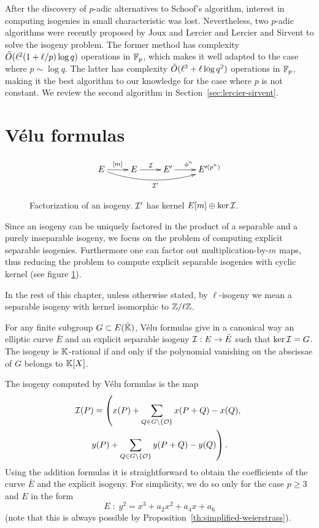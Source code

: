 After the discovery of $p$-adic alternatives to Schoof's
algorithm\cite{satoh00}, interest in computing isogenies in small
characteristic was lost. Nevertheless, two $p$-adic algorithms were
recently proposed by Joux and Lercier \cite{joux+lercier06} and
Lercier and Sirvent \cite{lercier+sirvent08} to solve the isogeny
problem. The former method has complexity $\tilde{O}(\ell^2(1 +
\ell/p)\log q)$ operations in $\mathbb{F}_p$, which makes it well adapted to
the case where $p\sim\log q$. The latter has complexity $\tilde{O}(\ell^3
+ \ell\log q^2)$ operations in $\mathbb{F}_p$, making it the best algorithm to
our knowledge for the case where $p$ is not constant. We review the
second algorithm in Section~\ref{sec:lercier-sirvent}.


\section{Vélu formulas}
\label{sec:velu-formulas}


\begin{figure}
  \centering
  \[\xymatrix{
    E \ar[r]^{[m]}\ar@/_1pc/[rrr]_{\I'} & E \ar[r]^\I & E' \ar[r]^{\frobisog^n} & E'^{(p^n)}\\
  }\]
  \label{fig:fact}
  \caption{Factorization of an isogeny. $\mathcal{I}'$ has kernel $E[m]\oplus\ker\mathcal{I}$.}
\end{figure}

Since an isogeny can be uniquely factored in the product of a
separable and a purely inseparable isogeny, we focus on the problem of
computing explicit separable isogenies. Furthermore one can factor out
multiplication-by-$m$ maps, thus reducing the problem to compute
explicit separable isogenies with cyclic kernel (see figure
\ref{fig:fact}).

In the rest of this chapter, unless otherwise stated, by
$\ell$-isogeny we mean a separable isogeny with kernel isomorphic to
$\mathbb{Z}/\ell\mathbb{Z}$.


For any finite subgroup $G \subset E(\bar{\mathbb{K}})$, Vélu formulas
\cite{Vel71} give in a canonical way an elliptic curve $\bar{E}$ and
an explicit separable isogeny $\mathcal{I}:E\rightarrow \bar{E}$ such that
$\ker\mathcal{I}=G$. The isogeny is $\mathbb{K}$-rational if and only if the polynomial
vanishing on the abscissae of $G$ belongs to $\mathbb{K}[X]$.

The isogeny computed by Vélu formulas is the map
\begin{multline}
  \label{eq:155}
  \mathcal{I}(P) = \left(x(P) + \sum_{Q\in G\backslash\{\mathcal{O}\}}x(P+Q) - x(Q),\right.\\
    \left.y(P) + \sum_{Q\in G\backslash\{\mathcal{O}\}}y(P+Q) - y(Q)\right)
  \text{.}
\end{multline}
Using the addition formulas it is straightforward to obtain the
coefficients of the curve $\bar{E}$ and the explicit isogeny.  For
simplicity, we do so only for the case $p\ge3$ and $E$ in the form
\begin{equation}
  \label{eq:160}
  E \;:\; y^2 =  x^3 + a_2x^2 + a_4x + a_6
\end{equation}
(note that this is always possible by
Proposition~\ref{th:simplified-weierstrass}). 

